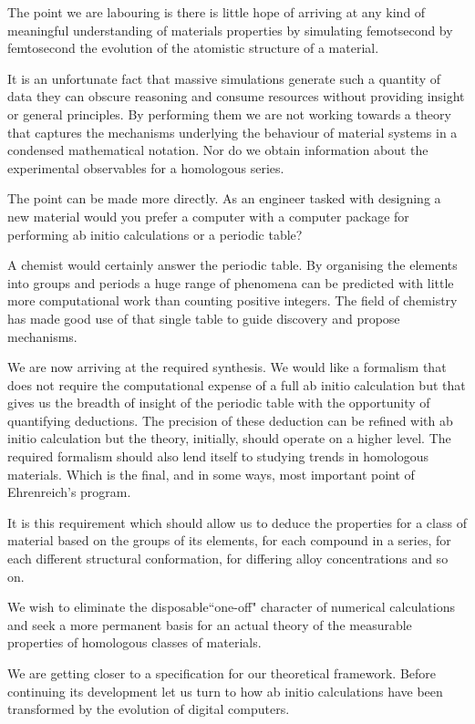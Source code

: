 The point we are labouring is there is little hope of arriving at any 
kind of meaningful understanding of materials properties by 
simulating femotsecond by femtosecond the evolution of the atomistic 
structure of a material.

It is an unfortunate fact that massive 
simulations generate such a quantity 
of data they can obscure reasoning and consume 
resources without providing insight or general principles. 
By performing them we are not working towards a theory that captures the mechanisms
underlying the behaviour of material systems in a condensed mathematical notation. Nor 
do we obtain information about the experimental 
observables for a homologous series.

The point can be made more directly. As an engineer tasked with designing a 
new material would you prefer a computer with a computer package for performing
ab initio calculations or a periodic table?

A chemist would certainly answer the periodic table. By organising the elements
into groups and periods a huge range 
of phenomena can be predicted with little more computational
work than counting positive integers.
The field of chemistry has made good use of that single table to guide
discovery and propose mechanisms.

We are now arriving at the required synthesis. We would like a 
formalism that does not require the computational expense of 
a full ab initio calculation but that gives us the breadth of insight
of the periodic table with the opportunity of quantifying deductions.
The precision of these deduction can be refined with ab initio calculation
but the theory, initially, should operate on a higher level.
The required formalism should also lend itself to 
studying trends in homologous materials.  
Which is the final, and in some ways, most important point of Ehrenreich's program.

It is this requirement which should allow us to deduce the properties
for a class of material based on the groups of its elements, 
for each compound in a series, for each different structural conformation,
for differing alloy concentrations and so on. 

We wish to eliminate the disposable``one-off" character of 
numerical calculations and seek a more permanent basis for an actual 
theory of the measurable properties of homologous classes of materials.

We are getting closer to a specification for our theoretical framework. 
Before continuing its development let us turn to how ab initio calculations have been 
transformed by the evolution of digital computers. 

